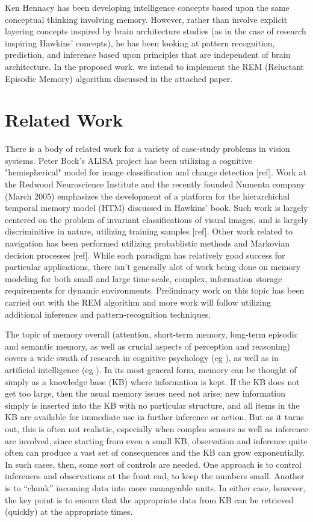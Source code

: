 \documentclass[12pt]{amsart}
\begin{document}
Ken Hennacy has been developing intelligence concepts based upon the
same conceptual thinking involving memory.  However, rather than
involve explicit layering concepts inspired by brain architecture
studies (as in the case of research inspiring Hawkins' concepts), he
has been looking at pattern recognition, prediction, and inference
based upon principles that are independent of brain architecture.  In
the proposed work, we intend to implement the REM (Reluctant Episodic
Memory) algorithm discussed in the attached paper.

\section{Related Work}

There is a body of related work for a variety of case-study problems
in vision systems.  Peter Bock's ALISA project has been utilizing a
cognitive "hemispherical" model for image classification and change
detection [ref].  Work at the Redwood Neuroscience Institute and the
recently founded Numenta company (March 2005) emphasizes the
development of a platform for the hierarchichal temporal memory model
(HTM) discussed in Hawkins' book.  Such work is largely centered on
the problem of invariant classifications of visual images, and is
largely discriminitive in nature, utilizing training samples [ref].
Other work related to navigation has been performed utilizing
probablistic methods and Markovian decision processes [ref].  While
each paradigm has relatively good success for particular applications,
there isn't generally alot of work being done on memory modeling for
both small and large time-scale, complex, information storage
requirements for dynamic environments.  Preliminary work on this topic
has been carried out with the REM algorithm and more work will follow
utilizing additional inference and pattern-recognition techniques.

The topic of memory overall (attention, short-term memory, long-term episodic
and semantic memory, as well as crucial aspects of perception and reasoning)
covers a wide swath of research in cognitive psychology 
(eg \cite{Cognition-3rd-ed-by-Mark-Ashcraft_Prentice-Hall_2002}),
as well as in artificial intelligence (eg \cite{SOAR,Prodigy,SNePS,Golog,elgot-drapkin/miller/perlis:mrt}). In its most general
form, memory can be thought of simply as a knowledge base (KB) where
information is kept. If the KB does not get too large, then the usual
memory issues need not arise: new information simply is inserted into
the KB with no particular structure, and all items in the KB are
available for immediate use in further inference or action. But as it
turns out, this is often not realistic, especially when comples
sensors as well as inference are involved, since starting from even a
small KB, observation and inference quite often can produce a vast set
of consequences and the KB can grow exponentially. In such cases,
then, some sort of controls are needed. One approach is to control
inferences and observations at the front end, to keep the numbers
small. Another is to ``chunk'' incoming data into more manageable
units. In either case, however, the key point is to ensure that the
appropriate data from KB can be retrieved (quickly) at the appropriate
times.
\end{document}
